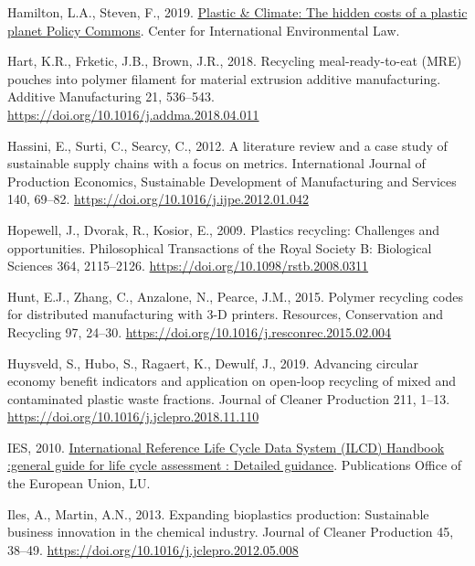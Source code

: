 \documentclass[12pt]{elsarticle} %
\newlength{\cslhangindent}
\newlength{\cslentryspacingunit} %
\newenvironment{CSLReferences}[2] %
 {%
  \setlength{\parindent}{0pt}
  \ifodd #1
  \let\oldpar\par
  \def\par{\hangindent=\cslhangindent\oldpar}
  \fi
  \setlength{\parskip}{#2\cslentryspacingunit}
 }%
 {}
\begin{document}
\begin{CSLReferences}{1}{0}
\leavevmode{}%
Hamilton, L.A., Steven, F., 2019. \href{https://policycommons.net/artifacts/2485040/untitled/3507468/}{Plastic \& {Climate}: {The} hidden costs of a plastic planet \textbar{} {Policy Commons}}. {Center for International Environmental Law}.

\leavevmode{}%
Hart, K.R., Frketic, J.B., Brown, J.R., 2018. Recycling meal-ready-to-eat ({MRE}) pouches into polymer filament for material extrusion additive manufacturing. Additive Manufacturing 21, 536--543. \url{https://doi.org/10.1016/j.addma.2018.04.011}

\leavevmode{}%
Hassini, E., Surti, C., Searcy, C., 2012. A literature review and a case study of sustainable supply chains with a focus on metrics. International Journal of Production Economics, Sustainable {Development} of {Manufacturing} and {Services} 140, 69--82. \url{https://doi.org/10.1016/j.ijpe.2012.01.042}

\leavevmode{}%
Hopewell, J., Dvorak, R., Kosior, E., 2009. Plastics recycling: Challenges and opportunities. Philosophical Transactions of the Royal Society B: Biological Sciences 364, 2115--2126. \url{https://doi.org/10.1098/rstb.2008.0311}

\leavevmode{}%
Hunt, E.J., Zhang, C., Anzalone, N., Pearce, J.M., 2015. Polymer recycling codes for distributed manufacturing with 3-{D} printers. Resources, Conservation and Recycling 97, 24--30. \url{https://doi.org/10.1016/j.resconrec.2015.02.004}

\leavevmode{}%
Huysveld, S., Hubo, S., Ragaert, K., Dewulf, J., 2019. Advancing circular economy benefit indicators and application on open-loop recycling of mixed and contaminated plastic waste fractions. Journal of Cleaner Production 211, 1--13. \url{https://doi.org/10.1016/j.jclepro.2018.11.110}

\leavevmode{}%
IES, 2010. \href{https://data.europa.eu/doi/10.2788/38479}{International {Reference Life Cycle Data System} ({ILCD}) {Handbook} :general guide for life cycle assessment : Detailed guidance}. {Publications Office of the European Union}, {LU}.

\leavevmode{}%
Iles, A., Martin, A.N., 2013. Expanding bioplastics production: Sustainable business innovation in the chemical industry. Journal of Cleaner Production 45, 38--49. \url{https://doi.org/10.1016/j.jclepro.2012.05.008}


\end{CSLReferences}
\end{document}
